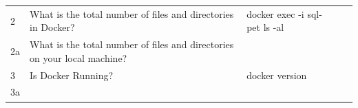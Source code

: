 \documentclass[]{book}
\theoremstyle{definition}
\theoremstyle{definition}
\theoremstyle{definition}
\theoremstyle{remark}
\begin{document}
\begin{longtable}[]{@{}lllll@{}}
\begin{minipage}[t]{0.02\columnwidth}
2\strut
\end{minipage} & \begin{minipage}[t]{0.19\columnwidth}\raggedright
What is the total number of files and directories in Docker?\strut
\end{minipage} & \begin{minipage}[t]{0.29\columnwidth}\raggedright
docker exec -i sql-pet ls -al\strut
\end{minipage} & \begin{minipage}[t]{0.20\columnwidth}\raggedright
\strut
\end{minipage} & \begin{minipage}[t]{0.16\columnwidth}\raggedright
\strut
\end{minipage}\tabularnewline
\begin{minipage}[t]{0.02\columnwidth}\raggedright
2a\strut
\end{minipage} & \begin{minipage}[t]{0.19\columnwidth}\raggedright
What is the total number of files and directories on your local
machine?\strut
\end{minipage} & \begin{minipage}[t]{0.29\columnwidth}\raggedright
\strut
\end{minipage} & \begin{minipage}[t]{0.20\columnwidth}\raggedright
\strut
\end{minipage} & \begin{minipage}[t]{0.16\columnwidth}\raggedright
\strut
\end{minipage}\tabularnewline
\begin{minipage}[t]{0.02\columnwidth}\raggedright
3\strut
\end{minipage} & \begin{minipage}[t]{0.19\columnwidth}\raggedright
Is Docker Running?\strut
\end{minipage} & \begin{minipage}[t]{0.29\columnwidth}\raggedright
docker version\strut
\end{minipage} & \begin{minipage}[t]{0.20\columnwidth}\raggedright
\strut
\end{minipage} & \begin{minipage}[t]{0.16\columnwidth}\raggedright
\strut
\end{minipage}\tabularnewline
\begin{minipage}[t]{0.02\columnwidth}\raggedright
3a\strut
\end{minipage} & \begin{minipage}[t]{0.19\columnwidth}\raggedright

\end{minipage}
\end{longtable}
\end{document}
